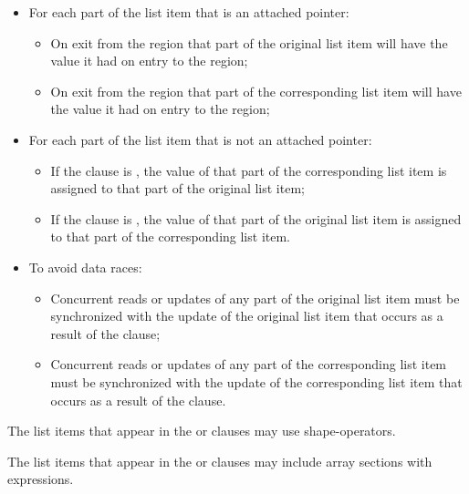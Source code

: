 \begin{itemize}
\item For each part of the list item that is an attached pointer:  

\begin{itemize}
\item On exit from the region that part of the original list item will
      have the value it had on entry to the region;
\item On exit from the region that part of the corresponding list item will
      have the value it had on entry to the region;
\end{itemize}

\item For each part of the list item that is not an attached pointer: 

\begin{itemize}
\item If the clause is , the value of that part of the corresponding 
      list item is assigned to that part of the original list item;
\item If the clause is , the value of that part of the original list 
      item is assigned to that part of the corresponding list item.
\end{itemize}

\item To avoid data races: 

\begin{itemize}
\item Concurrent reads or updates of any part of the original list item must be 
      synchronized with the update of the original list item that occurs as a 
      result of the  clause;
\item Concurrent reads or updates of any part of the corresponding list item must 
      be synchronized with the update of the corresponding list item that occurs 
      as a result of the  clause.
\end{itemize}

\end{itemize}


\begin{ccppspecific}
The list items that appear in the  or  clauses may
use shape-operators.
\end{ccppspecific}

The list items that appear in the  or  clauses may
include array sections with  expressions.

